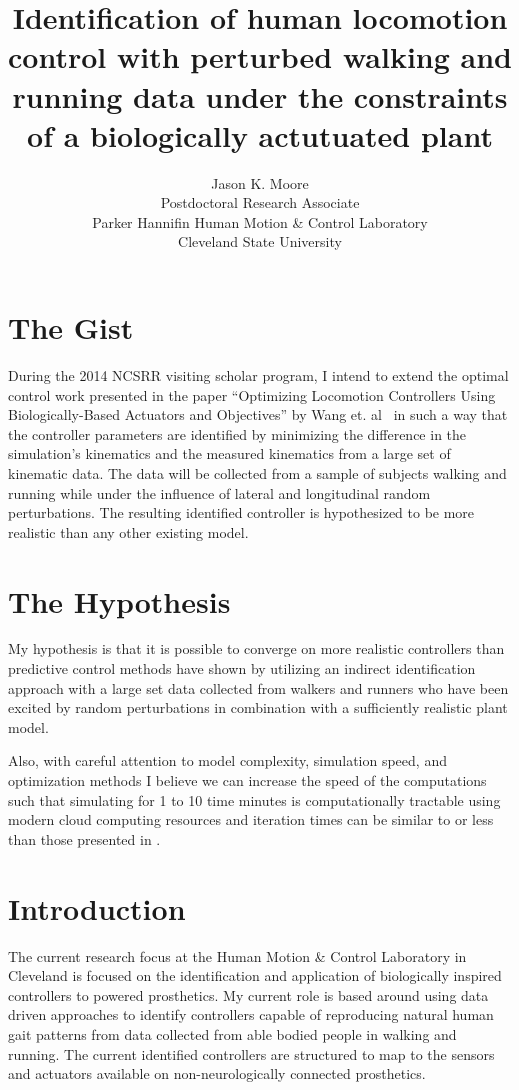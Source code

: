 \documentclass[11pt]{article}
\title{Identification of human locomotion control with perturbed walking and
running data under the constraints of a biologically actutuated plant}
\author{Jason K. Moore\\
  Postdoctoral Research Associate\\
  Parker Hannifin Human Motion \& Control Laboratory\\
  Cleveland State University
}
\begin{document}
\maketitle

\section*{The Gist}

During the 2014 NCSRR visiting scholar program, I intend to extend the optimal
control work presented in the paper ``Optimizing Locomotion Controllers Using
Biologically-Based Actuators and Objectives'' by Wang et. al~\cite{Wang2012} in
such a way that the controller parameters are identified by minimizing the
difference in the simulation's kinematics and the measured kinematics from a
large set of kinematic data. The data will be collected from a sample of
subjects walking and running while under the influence of lateral and
longitudinal random perturbations. The resulting identified controller is
hypothesized to be more realistic than any other existing model.

\section*{The Hypothesis}

My hypothesis is that it is possible to converge on more realistic controllers
than predictive control methods have shown by utilizing an indirect
identification approach with a large set data collected from walkers and
runners who have been excited by random perturbations in combination with a
sufficiently realistic plant model.

Also, with careful attention to model complexity, simulation speed, and
optimization methods I believe we can increase the speed of the computations
such that simulating for 1 to 10 time minutes is computationally tractable
using modern cloud computing resources and iteration times can be similar to or
less than those presented in \cite{Wang2012}.

\section*{Introduction}

The current research focus at the Human Motion \& Control Laboratory in
Cleveland is focused on the identification and application of biologically
inspired controllers to powered prosthetics. My current role is based around
using data driven approaches to identify controllers capable of reproducing
natural human gait patterns from data collected from able bodied people in
walking and running. The current identified controllers are structured to map
to the sensors and actuators available on non-neurologically connected
prosthetics.
\end{document}
